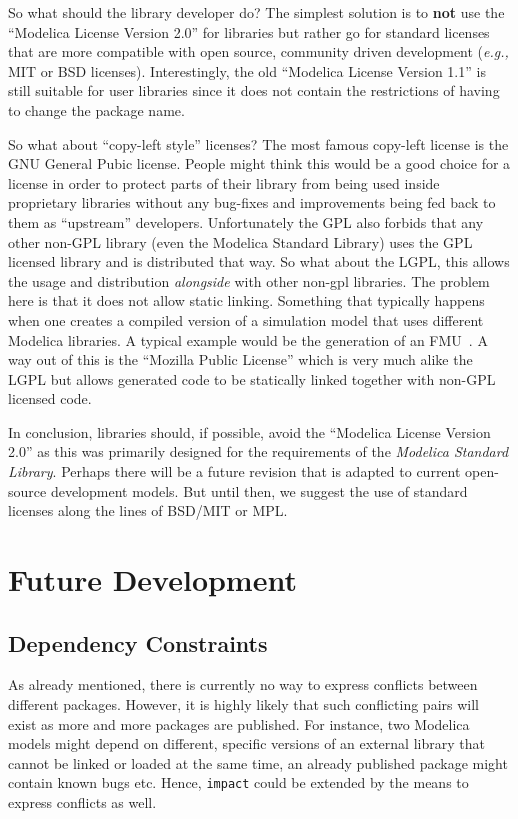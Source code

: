 \documentclass[11pt,a4paper,twocolumn]{article}
\newcommand{\code}[1]{\texttt{#1}} %
\begin{document}
So what should the library developer do? The simplest solution is to
\textbf{not} use the ``Modelica License Version 2.0'' for libraries
but rather go for standard licenses~\parencite{lic} that are more
compatible with open source, community driven development (\emph{e.g.,}
MIT or BSD licenses). Interestingly, the old ``Modelica License
Version 1.1'' is still suitable for user libraries since it does not
contain the restrictions of having to change the package name.

So what about ``copy-left style'' licenses? The most famous copy-left
license is the GNU General Pubic license. People might think this
would be a good choice for a license in order to protect parts of
their library from being used inside proprietary libraries without any
bug-fixes and improvements being fed back to them as ``upstream''
developers. Unfortunately the GPL also forbids that any other
\mbox{non-GPL} library (even the Modelica Standard Library) uses the
GPL licensed library and is distributed that way. So what about the
LGPL, this allows the usage and distribution \emph{alongside} with
other non-gpl libraries. The problem here is that it does not allow
static linking. Something that typically happens when one creates a
compiled version of a simulation model that uses different Modelica
libraries.  A typical example would be the generation of an
FMU~\parencite{FMI}.  A way out of this is the ``Mozilla Public
License'' which is very much alike the LGPL but allows generated code
to be statically linked together with non-GPL licensed code.

In conclusion, libraries should, if possible, avoid the ``Modelica
License Version 2.0'' as this was primarily designed for the
requirements of the \emph{Modelica Standard Library}. Perhaps there
will be a future revision that is adapted to current open-source
development models. But until then, we suggest the use of standard
licenses along the lines of BSD/MIT or MPL.


\section{Future Development}

\subsection{Dependency Constraints}
As already mentioned, there is currently no way to express conflicts
between different packages.  However, it is highly likely that such
conflicting pairs will exist as more and more packages are published.
For instance, two Modelica models might depend on different, specific
versions of an external library that cannot be linked or loaded at the
same time, an already published package might contain known bugs etc.
Hence, \code{impact} could be extended by the means to express
conflicts as well.
\end{document}
